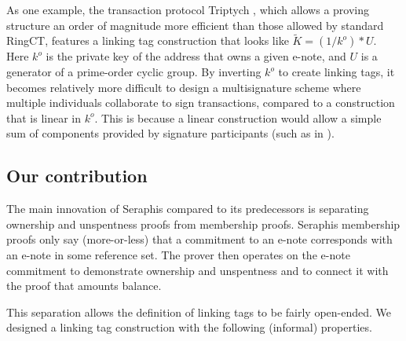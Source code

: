 As one example, the transaction protocol Triptych \cite{triptych-preprint}, which allows a proving structure an order of magnitude more efficient than those allowed by standard RingCT, features a linking tag construction that looks like $\tilde{K} = (1/k^o)*U$. Here $k^o$ is the private key of the address that owns a given e-note, and $U$ is a generator of a prime-order cyclic group. By inverting $k^o$ to create linking tags, it becomes relatively more difficult to design a multisignature scheme where multiple individuals collaborate to sign transactions, compared to a construction that is linear in $k^o$. This is because a linear construction would allow a simple sum of components provided by signature participants (such as in \cite{MRL-0009-multisig}).


\subsection{Our contribution}
\label{subsec:intro-our-contribution}

The main innovation of Seraphis compared to its predecessors is separating ownership and unspentness proofs from membership proofs. Seraphis membership proofs only say (more-or-less) that a commitment to an e-note corresponds with an e-note in some reference set. The prover then operates on the e-note commitment to demonstrate ownership and unspentness and to connect it with the proof that amounts balance.

This separation allows the definition of linking tags to be fairly open-ended. We designed a linking tag construction with the following (informal) properties.


